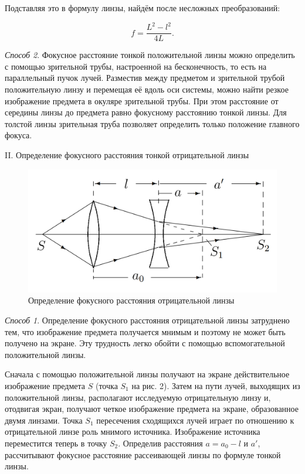 \documentclass[a4paper,12pt]{article} %
\begin{document}
	Подставляя это в формулу линзы, найдём после несложных преобразований:
	
	\begin{equation*}
		f = \frac{L^2 - l^2}{4L}.
	\end{equation*}
	
	\newpage
	\textit{Способ 2}. Фокусное расстояние тонкой положительной линзы можно определить с помощью зрительной трубы, настроенной на бесконечность, то есть на параллельный пучок лучей. Разместив между предметом и зрительной трубой положительную линзу и перемещая её вдоль оси системы, можно найти резкое изображение предмета в окуляре зрительной трубы. При этом расстояние от середины линзы до предмета равно фокусному расстоянию тонкой линзы. Для толстой линзы зрительная труба позволяет определить только положение главного фокуса.
	

	\begin{center}
		II. Определение фокусного расстояния тонкой отрицательной линзы
	\end{center}

	\begin{figure}[h!]
		\centering
		\includegraphics[scale=0.6]{Pictures/Отрицат}
		\caption{Определение фокусного расстояния отрицательной линзы}
	\end{figure}

	\textit{Способ 1}. Определение фокусного расстояния отрицательной линзы затруднено тем, что изображение предмета получается мнимым и поэтому не может быть получено на экране. Эту трудность легко обойти с помощью вспомогательной положительной линзы.
	
	Сначала с помощью положительной линзы получают на экране действительное изображение предмета $S$ (точка $S_1$ на рис. 2). Затем на пути лучей, выходящих из положительной линзы, располагают исследуемую отрицательную линзу и, отодвигая экран, получают четкое изображение предмета на экране, образованное двумя линзами. Точка $S_1$ пересечения сходящихся лучей играет по отношению к отрицательной линзе роль мнимого источника. Изображение источника переместится теперь в точку $S_2$. Определив расстояния $a = a_0 - l$ и $a'$, рассчитывают фокусное расстояние рассеивающей линзы по формуле тонкой линзы.
	
\end{document}
